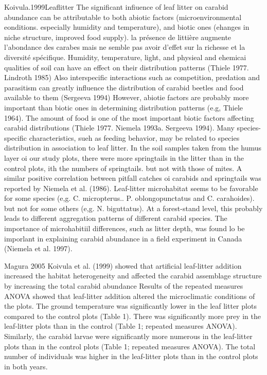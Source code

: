 Koivula.1999Leaflitter
The significant infiuence of leaf litter on carabid abundance can be attributable to both abiotic factors (microenvironmental eonditions. especially humidity and temperature), and biotic ones (ehanges in niche structure, improved food supply).
la présence de littière augmente l'abondance des carabes mais ne semble pas avoir d'effet sur la richesse et la diversité spécifique.
Humidity, temperature, light, and physieal and ehemicai qualities of soil can have an effect on their distribution patterns (Thiele 1977. Lindroth 1985)
Also interspecific interactions such as competition, predation and parasitism can greatly influence the distribution of carabid beetles and food available to them (Sergeeva 1994)
However, abiotie factors are probably more important than biotic ones in determining distribution patterns (e.g, Thiele 1964).
The amount of food is one of the most important biotic factors affecting carabid distributions (Thiele 1977. Niemela 1993a. Sergeeva 1994).
Many species-specific characteristics, sueh as feeding behavior, may be related to species distribution in association to leaf litter.
In the soil samples taken from the humus layer oi our study plots, there were more springtails in the litter than in the control plots,
ith the numbers of springtails. but not with those of mites. A similar positive correlation between pitfall catches oi carabids and springtails was reported by Niemela et al. (1986).
Leaf-litter microhabitat seems to be favorable for some species (e,g. C. micropterus.. P. oblongopunctatus and C. carahoides). but not for some others (e,g. N. biguttatus). At a forest-stand level, this probably leads to different aggregation patterns of different carabid species.
The importance of microhabitiil differences, such as litter depth, was found lo be imporlant in explaining carabid abundance in a field experiment in Canada (Niemela et al. 1997).

Magura 2005
Koivula et al. (1999) showed that artificial leaf-litter addition increased the habitat heterogeneity and affected the carabid assemblage structure by increasing the total carabid abundance
Results of the repeated measures ANOVA showed that leaf-litter addition altered the microclimatic conditions of the plots. The ground temperature was significantly lower in the leaf litter plots compared to the control plots (Table 1). There was significantly more prey in the leaf-litter plots than in the control (Table 1; repeated measures ANOVA). Similarly, the carabid larvae were significantly more numerous in the leaf-litter plots than in the control plots (Table 1; repeated measures ANOVA).
The total number of individuals was higher in the leaf-litter plots than in the control plots in both years.

